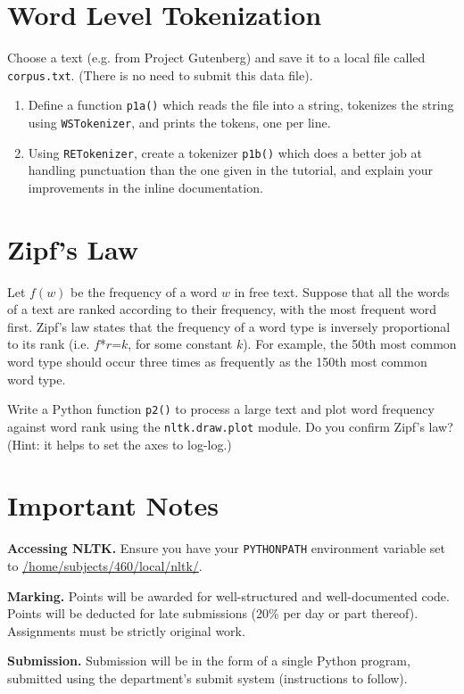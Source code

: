 \documentclass{460}
\begin{document}
\pagebreak

\section{Word Level Tokenization}

Choose a text (e.g. from Project Gutenberg)
and save it to a local file called \texttt{corpus.txt}.  (There is no need
to submit this data file).

\begin{enumerate}
    \item Define a function \texttt{p1a()} which reads the file into a
      string, tokenizes the string using \texttt{WSTokenizer},
      and prints the tokens, one per line.
    \item Using \texttt{RETokenizer}, create a tokenizer \texttt{p1b()}
      which does a better
      job at handling punctuation than the one given in the tutorial, and
      explain your improvements in the inline documentation.
\end{enumerate}

\section{Zipf's Law}

Let $f(w)$ be the frequency of a word $w$ in free text.  Suppose that
all the words of a text are ranked according to their frequency, with
the most frequent word first.
Zipf's law states that the frequency of a word type is inversely
proportional to its rank (i.e. $f$*$r$=$k$, for some constant $k$).
For example, the 50th most common word type should
occur three times as frequently as the 150th most common word type.

Write a Python function \texttt{p2()}
to process a large text and plot word frequency
against word rank using the \texttt{nltk.draw.plot} module.
Do you confirm Zipf's law?  (Hint: it helps to
set the axes to log-log.)

\section*{Important Notes}

{\bf Accessing NLTK.}
Ensure you have your \texttt{PYTHONPATH} environment variable
set to \url{/home/subjects/460/local/nltk/}.

{\bf Marking.}  Points will be awarded for well-structured and
well-documented code.  Points will be deducted for late submissions
(20\% per day or part thereof).  Assignments must be strictly original
work.

{\bf Submission.}
Submission will be in the form of a single Python program,
submitted using the department's submit system
(instructions to follow).
\end{document}
